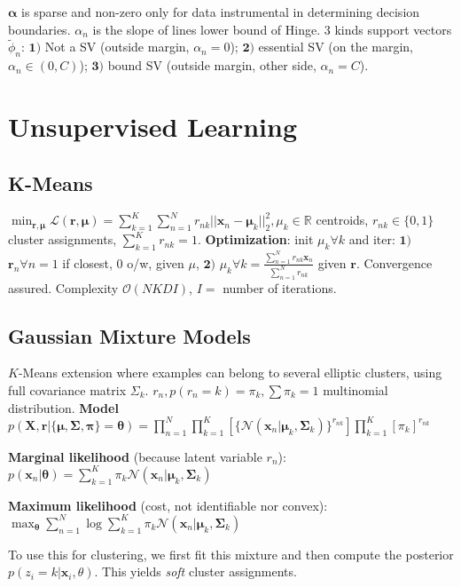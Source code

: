 \documentclass[10pt,a4paper,landscape]{article}
\renewcommand{\bf}[1]{\ensuremath{\mathbf{#1}}}
\newcommand{\balpha}{\boldsymbol\alpha}
\begin{document}
\begin{multicols*}{4}
$\balpha$ is sparse and non-zero only for data instrumental in determining decision boundaries. $\alpha_n$ is the slope of lines lower bound of Hinge. 3 kinds support vectors $\tilde{\phi}_n$: $\bf{1)}$ Not a SV (outside margin, $\alpha_n = 0$); $\bf{2)}$ essential SV (on the margin, $\alpha_n \in (0,C)$); $\bf{3)}$ bound SV (outside margin, other side, $\alpha_n = C$).

\section{Unsupervised Learning}
\subsection{K-Means}
$\min_{\bf{r,\mu}} \mathcal{L}(\bf{r, \mu}) = 
\sum_{k=1}^K \sum_{n=1}^N r_{nk} ||\bf{x}_n - \bf{\mu}_k ||_2^2, \mu_k \in \mathbb{R}$ centroids, $r_{nk} \in \{0,1\}$  cluster assignments, $\sum_{k=1}^K r_{nk} = 1$.
\textbf{Optimization}: init $\mu_k \forall k$ and iter: $\bf{1)}$ $\bf{r}_n \forall n = 1$ if closest, $0$ o/w, given $\mu$, 
$\bf{2)}$ $\mu_k \forall k = 
\frac{\sum^N_{n=1} r_{nk} \bf{x}_n}{\sum^N_{n=1} r_{nk}}$
given $\bf{r}$.
Convergence assured. Complexity $\mathcal{O}(NKDI)$, $I =$ number of iterations.

\subsection{Gaussian Mixture Models}
$K$-Means extension where examples can belong to several elliptic clusters, using full covariance matrix $\Sigma_k$. $r_n, p(r_n=k)=\pi_k, \sum \pi_k = 1$ multinomial distribution.
\textbf{Model} $p(\bf{X}, \bf{r} | \{\bf{\mu}, \bf{\Sigma}, \bf{\pi}\} = \bf{\theta}) = \prod\limits_{n=1}^N \prod\limits_{k=1}^K [\{\mathcal{N}(\bf{x}_n | \bf{\mu}_k , \bf{\Sigma}_k ) \}^{r_{nk}}] \prod\limits_{k=1}^K [\pi_k]^{r_{nk}}$

\textbf{Marginal likelihood} (because latent variable $r_n$): $p(\bf{x}_n | \bf{\theta}) = \sum_{k=1}^K \pi_k \mathcal{N}(\bf{x}_n | \bf{\mu}_k, \bf{\Sigma}_k)$

\textbf{Maximum likelihood} (cost, not identifiable nor convex): $\max_{\bf{\theta}} \sum_{n=1}^N \log \sum_{k=1}^K \pi_k \mathcal{N} ( \bf{x}_n | \bf{\mu}_k , \bf{\Sigma}_k)$

To use this for clustering, we first fit this mixture and then compute the posterior $p(z_i = k | \bf{x}_i, \theta)$. This yields \textit{soft} cluster assignments.


\end{multicols*}
\end{document}
